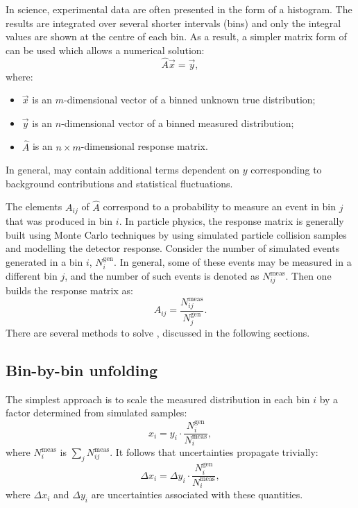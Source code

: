 In science, experimental data are often presented in the form of a histogram. 
The results are integrated over several shorter intervals (bins) and only the integral values are shown at the centre of each bin.
As a result, a simpler matrix form of  can be used which allows a numerical solution:
\begin{equation}\label{eq:unfolding_linear_equation}
\hat{A}\vec{x}=\vec{y},
\end{equation}
where:
\begin{itemize}
    \item $\vec{x}$ is an $m$-dimensional vector of a binned unknown true distribution;
    \item $\vec{y}$ is an $n$-dimensional vector of a binned measured distribution;
    \item $\hat{A}$ is an $n\times m$-dimensional response matrix.

\end{itemize}
In general,  may contain additional terms dependent on $y$ corresponding to background contributions and statistical fluctuations.

The elements $A_{ij}$ of $\hat{A}$ correspond to a probability to measure an event in bin $j$ that was produced in bin $i$.
In particle physics, the response matrix is generally built using Monte Carlo techniques by using simulated particle collision samples and modelling the detector response.
Consider the number of simulated events generated in a bin $i$, $N_i^{\mathrm{gen}}$. 
In general, some of these events may be measured in a different bin $j$, and the number of such events is denoted as $N_{ij}^{\mathrm{meas}}$.
Then one builds the response matrix as:
\begin{equation}\label{eq:response_matrix_element}
    A_{ij} = \frac{N_{ij}^{\mathrm{meas}}}{N_j^{\mathrm{gen}}}.
\end{equation}
There are several methods to solve , discussed in the following sections.

\subsection{Bin-by-bin unfolding}

The simplest approach is to scale the measured distribution in each bin $i$ by a factor determined from simulated samples:
\begin{equation}\label{eq:bin_by_bin_unfolding}
 x_i = y_i \cdot \frac{N_i^{\mathrm{gen}}}{N_i^{\mathrm{meas}}},
\end{equation}
where $N_i^{\mathrm{meas}}$ is $\sum_j N_{ij}^{\mathrm{meas}}$.
It follows that uncertainties propagate trivially:
\begin{equation}\label{eq:bin_by_bin_unfolding_error}
    \Delta x_i = \Delta y_i \cdot \frac{N_i^{\mathrm{gen}}}{N_i^{\mathrm{meas}}},
\end{equation}
where $\Delta x_i$ and $\Delta y_i$ are uncertainties associated with these quantities.


